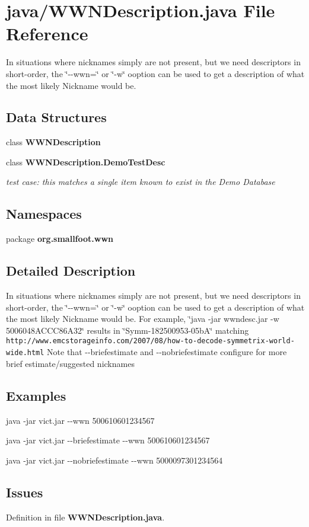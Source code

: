 \section{java/\-W\-W\-N\-Description.java \-File \-Reference}
\label{WWNDescription_8java}


\-In situations where nicknames simply are not present, but we need descriptors in short-\/order, the \char`\"{}-\/-\/wwn=\char`\"{} or \char`\"{}-\/w\char`\"{} ooption can be used to get a description of what the most likely \-Nickname would be.  


\subsection*{\-Data \-Structures}
\begin{DoxyCompactItemize}
\item 
class {\bf \-W\-W\-N\-Description}
\item 
class {\bf \-W\-W\-N\-Description.\-Demo\-Test\-Desc}
\begin{DoxyCompactList}\small\item\em test case\-: this matches a single item known to exist in the \-Demo \-Database \end{DoxyCompactList}\end{DoxyCompactItemize}
\subsection*{\-Namespaces}
\begin{DoxyCompactItemize}
\item 
package {\bf org.\-smallfoot.\-wwn}
\end{DoxyCompactItemize}


\subsection{\-Detailed \-Description}
\-In situations where nicknames simply are not present, but we need descriptors in short-\/order, the \char`\"{}-\/-\/wwn=\char`\"{} or \char`\"{}-\/w\char`\"{} ooption can be used to get a description of what the most likely \-Nickname would be. \-For example, \char`\"{}java -\/jar wwndesc.\-jar -\/w 5006048\-A\-C\-C\-C86\-A32\char`\"{} results in \char`\"{}\-Symm-\/182500953-\/05b\-A\char`\"{} matching {\tt http\-://www.\-emcstorageinfo.\-com/2007/08/how-\/to-\/decode-\/symmetrix-\/world-\/wide.\-html} \-Note that -\/-\/briefestimate and -\/-\/nobriefestimate configure for more brief estimate/suggested nicknames\subsection{\-Examples}\label{WWNDescription_8java_Examples}
java -\/jar vict.\-jar -\/-\/wwn 500610601234567

java -\/jar vict.\-jar -\/-\/briefestimate -\/-\/wwn 500610601234567

java -\/jar vict.\-jar -\/-\/nobriefestimate -\/-\/wwn 5000097301234564\subsection{\-Issues}\label{WWNDescription_8java_Known}


\-Definition in file {\bf \-W\-W\-N\-Description.\-java}.

